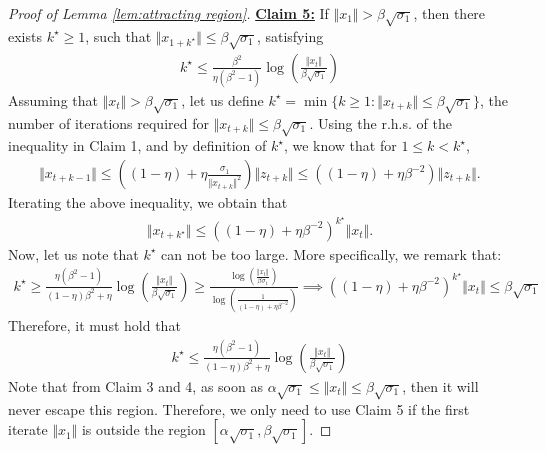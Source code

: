 \begin{proof}[Proof of Lemma \ref{lem:attracting region}]
\underline{\textbf{Claim 5:}} If $\Vert x_1 \Vert > \beta \sqrt{\sigma_1}$, then there exists $k^\star \ge 1$, such that $\Vert x_{1+k^\star}\Vert \le \beta \sqrt{\sigma_1}$, satisfying 
\begin{align}
    k^\star \le \frac{\beta^2}{\eta (\beta^2 - 1)} \log\left( \frac{\Vert x_t \Vert }{\beta \sqrt{\sigma_1}}\right)
\end{align}
Assuming that $\Vert x_t \Vert > \beta \sqrt{\sigma_1}$, let us define 
$
k^\star = \min \lbrace k \ge 1: \Vert x_{t+k}\Vert \le \beta \sqrt{\sigma_1}   \rbrace
$, the number of iterations required for $\Vert x_{t+k} \Vert \le \beta \sqrt{\sigma_1}$. Using the r.h.s. of the inequality in Claim 1, and by definition of $k^\star$, we know that for $1 \le k < k^\star$, 
\begin{align}
    \Vert x_{t+k-1} \Vert \le \left((1-\eta) + \eta \frac{\sigma_1}{\Vert x_{t+k} \Vert^2}\right) \Vert z_{t+k}\Vert \le  \left((1-\eta) + \eta \beta^{-2}\right) \Vert z_{t+k}\Vert. 
\end{align}
Iterating the above inequality, we obtain that  
\begin{align*}
    \Vert x_{t+k^\star} \Vert \le  \left((1-\eta) + \eta \beta^{-2}\right)^{k^\star } \Vert x_t \Vert. 
\end{align*}
Now, let us note that $k^\star$ can not be too large. More specifically, we remark that: 
\begin{align*}
    k^\star \ge  \frac{\eta (\beta^2 - 1)}{(1- \eta) \beta^2  + \eta }  \log\left(\frac{\Vert x_t \Vert}{\beta \sqrt{\sigma_1}}\right) \ge \frac{\log\left(\frac{\Vert x_t \Vert}{\beta \sigma_1}\right)}{\log\left( \frac{1}{(1-\eta) + \eta \beta^{-2}}  \right)} \implies \left((1-\eta) + \eta \beta^{-2}\right)^{k^\star } \Vert x_t \Vert  \le \beta \sqrt{\sigma_1} 
\end{align*}
Therefore, it must hold that 
\begin{align*}
    k^\star \le  \frac{\eta (\beta^2 - 1)}{(1- \eta) \beta^2  + \eta }  \log\left(\frac{\Vert x_t \Vert}{\beta\sqrt{\sigma_1}}\right)
\end{align*}
Note that from Claim 3 and 4, as soon as $ \alpha \sqrt{\sigma_1} \le \Vert x_t \Vert \le \beta \sqrt{\sigma_1} $, then it will never escape this region. Therefore, we only need to use Claim 5 if the first iterate $\Vert x_1 \Vert$ is outside the region $[\alpha \sqrt{\sigma_1} , \beta \sqrt{\sigma_1} ]$.
\end{proof}


